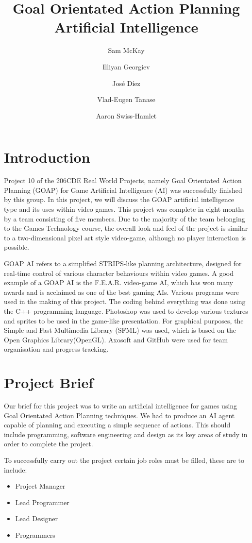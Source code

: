 \documentclass[a4paper]{report}
\begin{document}


\title{Goal Orientated Action Planning Artificial Intelligence}
\author{Sam McKay \and Illiyan Georgiev \and José Díez\and Vlad-Eugen Tanase \and Aaron Swiss-Hamlet }
\maketitle
\tableofcontents
\chapter{Introduction}
Project 10 of the 206CDE Real World Projects, namely Goal Orientated Action Planning (GOAP) for Game Artificial Intelligence (AI) was successfully finished by this group. In this project, we will discuss the GOAP artificial intelligence type and its uses within video games. This project was complete in eight months by a team consisting of five members. Due to the majority of the team belonging to the Games Technology course, the overall look and feel of the project is similar to a two-dimensional pixel art style video-game, although no player interaction is possible. 
 
GOAP AI refers to a simplified STRIPS-like planning architecture, designed for real-time control of various character behaviours within video games. A good example of a GOAP AI is the F.E.A.R. video-game AI, which has won many awards and is acclaimed as one of the best gaming AIs. Various programs were used in the making of this project. The coding behind everything was done using the C++ programming language. Photoshop was used to develop various textures and sprites to be used in the game-like presentation. For graphical purposes, the Simple and Fast Multimedia Library (SFML) was used, which is based on the Open Graphics Library(OpenGL). Axosoft and GitHub were used for team organisation and progress tracking.

\chapter{Project Brief}
Our brief for this project was to write an artificial intelligence for games using Goal Orientated Action Planning techniques. We had to produce an AI agent capable of planning and executing a simple sequence of actions. This should include programming, software engineering and design as its key areas of study in order to complete the project. 

To successfully carry out the project certain job roles must be filled, these are to include:
\begin{itemize}
	\item Project Manager
	\item Lead Programmer
	\item Lead Designer
	\item Programmers
\end{itemize} 
\end{document}

